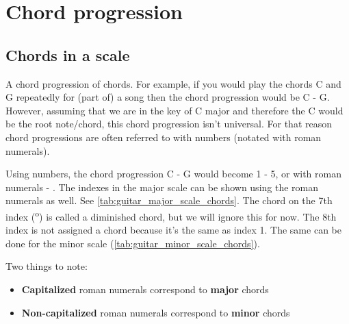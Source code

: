 \section{Chord progression} \label{sec:chord_progression}

\subsection{Chords in a scale}

A chord progression of chords. For example, if you would play the chords C and G repeatedly for (part of) a song then the chord progression would be C - G. However, assuming that we are in the key of C major and therefore the C would be the root note/chord, this chord progression isn't universal. For that reason chord progressions are often referred to with numbers (notated with roman numerals).

Using numbers, the chord progression C - G would become 1 - 5, or with roman numerals  - . The indexes in the major scale can be shown using the roman numerals as well. See \autoref{tab:guitar_major_scale_chords}. The chord on the 7th index (\textsuperscript{o}) is called a diminished chord, but we will ignore this for now. The 8th index is not assigned a chord because it's the same as index 1. The same can be done for the minor scale (\autoref{tab:guitar_minor_scale_chords}).

Two things to note:

\begin{itemize}
	\item \textbf{Capitalized} roman numerals correspond to \textbf{major} chords
	\item \textbf{Non-capitalized} roman numerals correspond to \textbf{minor} chords
\end{itemize}

